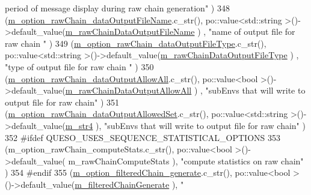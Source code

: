 \begin{DoxyCode}
{      period of message display during raw chain generation"}           )
348     (\hyperlink{class_q_u_e_s_o_1_1_m_l_sampling_level_options_ad1d736cccbf3be64e1998c18ead26630}{m\_option\_rawChain\_dataOutputFileName}.c\_str(),                
      po::value<std::string >()->default\_value(\hyperlink{class_q_u_e_s_o_1_1_m_l_sampling_level_options_ab89d7ed301a956f913058a8e5f63fbbd}{m\_rawChainDataOutputFileName}               )
      , \textcolor{stringliteral}{"name of output file for raw chain "}                              )
349     (\hyperlink{class_q_u_e_s_o_1_1_m_l_sampling_level_options_a3cbc234ca24903ff9addc9a379bb69bf}{m\_option\_rawChain\_dataOutputFileType}.c\_str(),                
      po::value<std::string >()->default\_value(\hyperlink{class_q_u_e_s_o_1_1_m_l_sampling_level_options_a239091edd94cfa694c6c33591c1d1ba2}{m\_rawChainDataOutputFileType}               )
      , \textcolor{stringliteral}{"type of output file for raw chain "}                              )
350     (\hyperlink{class_q_u_e_s_o_1_1_m_l_sampling_level_options_a5edf0fb3329b34a79dee8d3f2187dd28}{m\_option\_rawChain\_dataOutputAllowAll}.c\_str(),                
      po::value<bool        >()->default\_value(\hyperlink{class_q_u_e_s_o_1_1_m_l_sampling_level_options_a4e84fdd26bf87099d2b126f5fda379a6}{m\_rawChainDataOutputAllowAll}               )
      , \textcolor{stringliteral}{"subEnvs that will write to output file for raw chain"}            )
351     (\hyperlink{class_q_u_e_s_o_1_1_m_l_sampling_level_options_ad7b34b44ea9dcfbf9092167bdb9d4ecb}{m\_option\_rawChain\_dataOutputAllowedSet}.c\_str(),              
      po::value<std::string >()->default\_value(\hyperlink{class_q_u_e_s_o_1_1_m_l_sampling_level_options_a399d93049d7862d47c8ac68e1885d0c9}{m\_str4}                                     ), \textcolor{stringliteral}{"subEnvs that will
       write to output file for raw chain"}            )
352 #ifdef QUESO\_USES\_SEQUENCE\_STATISTICAL\_OPTIONS
353     (m\_option\_rawChain\_computeStats.c\_str(),                      po::value<bool        >()->default\_value(
      m\_rawChainComputeStats                     ), \textcolor{stringliteral}{"compute statistics on raw chain"}                             
          )
354 #endif
355     (\hyperlink{class_q_u_e_s_o_1_1_m_l_sampling_level_options_a889952cbad52c41c179ff6ffecf82dd7}{m\_option\_filteredChain\_generate}.c\_str(),                     
      po::value<bool        >()->default\_value(\hyperlink{class_q_u_e_s_o_1_1_m_l_sampling_level_options_a878542ef3504c843b50e0bd5efd0c078}{m\_filteredChainGenerate}                    ), \textcolor{stringliteral}{"
}
\end{DoxyCode}

